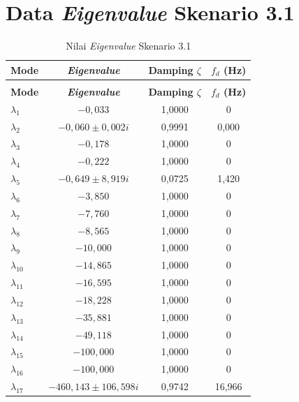 \section{Data \textit{Eigenvalue} Skenario 3.1}
\begingroup
\fontsize{11}{13.2}\selectfont
\setlength{\tabcolsep}{7pt}
\begin{longtable}{>{\centering\arraybackslash}m{1.5cm} c c c} \caption[]{Nilai
	\textit{Eigenvalue} Skenario 3.1} \label{tab:eigenvalue_sk31_lampiran} \\
	\toprule
	\textbf{Mode} & \textbf{\textit{Eigenvalue}} & \textbf{Damping $\zeta$} &
	\textbf{$f_d$ (Hz)} \\
	\midrule
	\endfirsthead
	\multicolumn{4}{l}{\textit{(lanjutan)}} \\
	\toprule
	\textbf{Mode} & \textbf{\textit{Eigenvalue}} & \textbf{Damping $\zeta$} &
	\textbf{$f_d$ (Hz)} \\
	\midrule
	\endhead
	\bottomrule
	\endfoot
	$\lambda_1$  & $-0{,}033$                      & 1,0000 & 0 \\
	$\lambda_2$  & $-0{,}060 \pm 0{,}002i$         & 0,9991 & 0,000 \\
	$\lambda_3$  & $-0{,}178$                      & 1,0000 & 0 \\
	$\lambda_4$  & $-0{,}222$                      & 1,0000 & 0 \\
	$\lambda_5$  & $-0{,}649 \pm 8{,}919i$         & 0,0725 & 1,420 \\
	$\lambda_6$  & $-3{,}850$                      & 1,0000 & 0 \\
	$\lambda_7$  & $-7{,}760$                      & 1,0000 & 0 \\
	$\lambda_8$  & $-8{,}565$                      & 1,0000 & 0 \\
	$\lambda_9$  & $-10{,}000$                     & 1,0000 & 0 \\
	$\lambda_{10}$ & $-14{,}865$                   & 1,0000 & 0 \\
	$\lambda_{11}$ & $-16{,}595$                   & 1,0000 & 0 \\
	$\lambda_{12}$ & $-18{,}228$                   & 1,0000 & 0 \\
	$\lambda_{13}$ & $-35{,}881$                   & 1,0000 & 0 \\
	$\lambda_{14}$ & $-49{,}118$                   & 1,0000 & 0 \\
	$\lambda_{15}$ & $-100{,}000$                  & 1,0000 & 0 \\
	$\lambda_{16}$ & $-100{,}000$                  & 1,0000 & 0 \\
	$\lambda_{17}$ & $-460{,}143 \pm 106{,}598i$   & 0,9742 & 16,966 \\
\end{longtable}
\par
\endgroup

